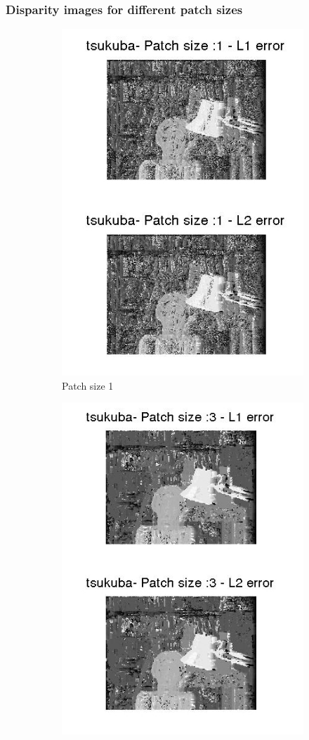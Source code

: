 \documentclass[fleqn]{article}
\begin{document}
\subsubsection{Disparity images for different patch sizes}
\begin{figure}[!ht]
 \begin{subfigure}{0.5\textwidth}
 \centering
\includegraphics[scale=0.3]{./pics/tsukuba_disparity_patchsize_1.jpg}
\caption{Patch size 1}
\end{subfigure}
 \begin{subfigure}{0.5\textwidth}
 \centering
\includegraphics[scale=0.3]{./pics/tsukuba_disparity_patchsize_3.jpg}

\end{subfigure}
\end{figure}
\end{document}
